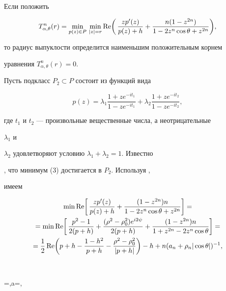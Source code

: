 Если положить


$$


T^n_{\alpha,\theta}(r)=\min_{p(z)\in P}\,


\min_{|z|=r}\re\biggl(\,


\frac{zp'(z)}{p(z)+h}+


\frac{n(1-z^{2n})}{1-2z^n\cos\theta+z^{2n}}\biggr),


$$


то радиус выпуклости определится наименьшим положительным корнем


уравнения $T^n_{\alpha,\theta}(r)=0$.





Пусть подкласс $P_2\subset P$ состоит из функций вида


$$


p(z)=\lambda_1\frac{1+ze^{-it_1}}{1-ze^{-it_1}}+


\lambda_2\frac{1+ze^{-it_2}}{1-ze^{-it_2}},


$$


где $t_1$ и $t_2$ --- произвольные вещественные числа, а неотрицательные


$\lambda_1$ и


$\lambda_2$ удовлетворяют условию $\lambda_1+\lambda_2=1$. Известно


\cite{Zm}, что минимум (3) достигается в $P_2$. Используя \cite{Zm},


имеем


\begin{multline}


\min\re\biggl[\,\frac{zp'(z)}{p(z)+h}+


\frac{(1-z^{2n})n}{1-2z^n\cos\theta+z^{2n}}\biggr]=\\


%


=\min\re\biggl[\,\frac{p^2-1}{2(p+h)}+


\frac{(\rho^2-\rho^2_0)e^{i2\psi}}{2(p+h)}+


\frac{(1-z^{2n})n}{1+z^{2n}-2z^n\cos\theta}\biggr]=\\


%


=\frac{1}{2}\re\biggl(p+h-\frac{1-h^2}{p+h}-


\frac{\rho^2-\rho^2_0}{|p+h|}\biggr)-h+n(a_n+\rho_n|\cos\theta|)^{-1},


\end{multline}


$$


\rho=,\quad a=,\quad


